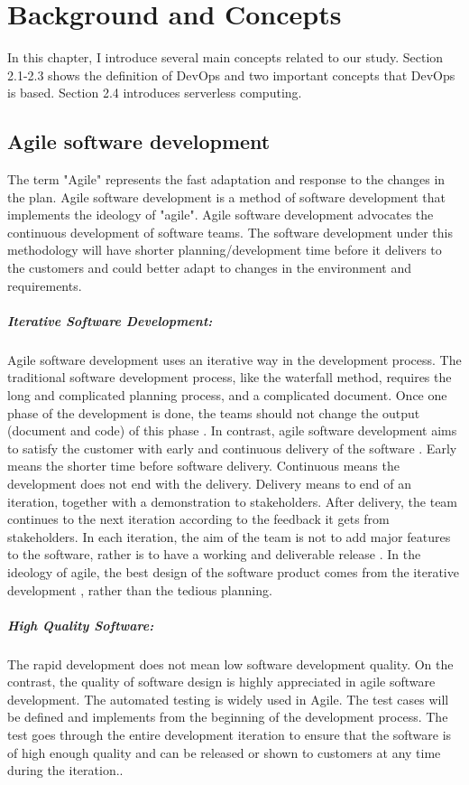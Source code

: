 \chapter{Background and Concepts}
In this chapter, I introduce several main concepts related to our study. Section 2.1-2.3 shows the definition of DevOps and two important concepts that DevOps is based. Section 2.4 introduces serverless computing.
\section{Agile software development}
\label{agile}
The term "Agile" represents the fast adaptation and response to the changes in the plan\cite{highsmith2002agile}.
Agile software development is a method of software development that implements the ideology of "agile". Agile software development advocates the continuous development of software teams. The software development under this methodology will have shorter planning/development time before it delivers to the customers and could better adapt to changes in the environment and requirements.
\paragraph{Iterative Software Development:} Agile software development uses an iterative way in the development process. The traditional software development process, like the waterfall method, requires the long and complicated planning process, and a complicated document. Once one phase of the development is done, the teams should not change the output (document and code) of this phase \cite{cusumano1995beyond}. In contrast, agile software development aims to satisfy the customer with early and continuous delivery of the software \cite{beck2001manifesto}. Early means the shorter time before software delivery. Continuous means the development does not end with the delivery. Delivery means to end of an iteration, together with a demonstration to stakeholders. After delivery, the team continues to the next iteration according to the feedback it gets from stakeholders. In each iteration, the aim of the team is not to add major features to the software, rather is to have a working and deliverable release \cite{beck1999embracing}. In the ideology of agile, the best design of the software product comes from the iterative development \cite{beck2001manifesto}, rather than the tedious planning. 

\paragraph{High Quality Software:} The rapid development does not mean low software development quality. On the contrast, the quality of software design is highly appreciated in agile software development. The automated testing is widely used in Agile. The test cases will be defined and implements from the beginning of the development process. The test goes through the entire development iteration to ensure that the software is of high enough quality and can be released or shown to customers at any time during the iteration.\cite{Agilesof32:online}.
